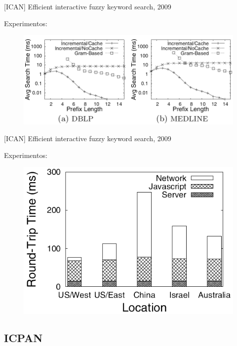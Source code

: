 \documentclass[11pt]{beamer}
\begin{document}
\begin{frame}{[ICAN] Efficient interactive fuzzy keyword search, 2009}

    Experimentos:

    \begin{figure}
      \includegraphics[scale=0.35]{pictures/ican_0_ex.png}
      \centering
    \end{figure}
    
\end{frame}

\begin{frame}{[ICAN] Efficient interactive fuzzy keyword search, 2009}

    Experimentos:

    \begin{figure}
      \includegraphics[scale=0.40]{pictures/ican_1_ex.png}
      \centering
    \end{figure}
    
\end{frame}

\subsection{ICPAN}
\end{document}
